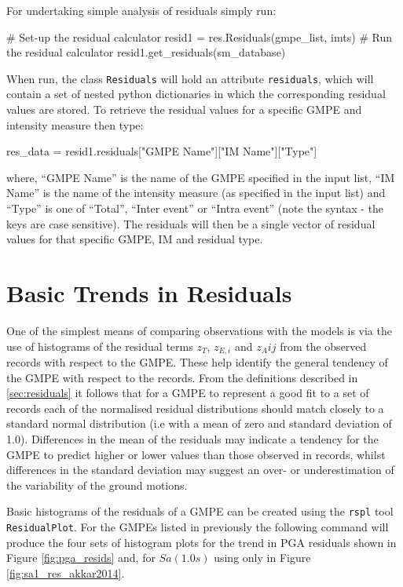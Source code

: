 For undertaking simple analysis of residuals simply run:

\begin{python}[frame=single]
# Set-up the residual calculator
resid1 = res.Residuals(gmpe_list, imts)
# Run the residual calculator
resid1.get_residuals(sm_database)
\end{python}

When run, the class \verb=Residuals= will hold an attribute \verb=residuals=, which will contain a set of nested python dictionaries in which the corresponding residual values are stored. To retrieve the residual values for a specific GMPE and intensity measure then type:

\begin{python}
res_data = resid1.residuals["GMPE Name"]["IM Name"]["Type"]
\end{python}

where, ``GMPE Name'' is the name of the GMPE specified in the input list, ``IM Name'' is the name of the intensity measure (as specified in the input list) and ``Type'' is one of ``Total'', ``Inter event'' or ``Intra event'' (note the syntax - the keys are case sensitive). The residuals will then be a single vector of residual values for that specific GMPE, IM and residual type.
  

\section{Basic Trends in Residuals}
\label{sec:residual_trends}

One of the simplest means of comparing observations with the models is via the use of histograms of the residual terms $z_T$, $z_{E, i}$ and $z_A{ij}$ from the observed records with respect to the GMPE. These help identify the general tendency of the GMPE with respect to the records. From the definitions described in \ref{sec:residuals} it follows that for a GMPE to represent a good fit to a set of records each of the normalised residual distributions should match closely to a standard normal distribution (i.e with a mean of zero and standard deviation of 1.0). Differences in the mean of the residuals may indicate a tendency for the GMPE to predict higher or lower values than those observed in records, whilst differences in the standard deviation may suggest an over- or underestimation of the variability of the ground motions.

Basic histograms of the residuals of a GMPE can be created using the \verb=rspl= tool \verb=ResidualPlot=. For the GMPEs listed in previously the following command will produce the four sets of histogram plots for the trend in PGA residuals shown in Figure \ref{fig:pga_resids} and, for $Sa \left( {1.0 s} \right)$ using \cite{Akkar_etal2014} only in Figure \ref{fig:sa1_res_akkar2014}.

